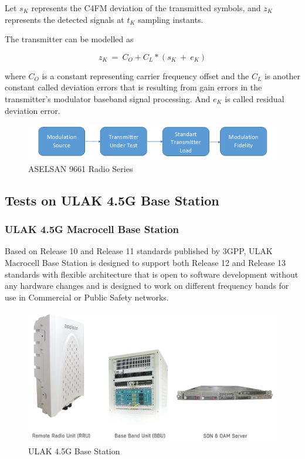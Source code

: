 	Let $s_K$ represents the C4FM deviation of the transmitted symbols, and $z_K$ represents the detected signals at $t_K$ sampling instants.
	
	The transmitter can be modelled as
	
	$$ z_K~=~C_O+C_L*(s_K~+~e_K) $$
	
	where $C_O$ is a constant representing carrier frequency offset and the $C_L$ is another constant called deviation errors that is resulting from gain errors in the transmitter's modulator baseband signal processing. And $e_K$ is called residual deviation error.
	
	
\begin{figure}[H]
	\center
	\setlength{\unitlength}{\textwidth} 
	\includegraphics[width=1.0\unitlength]{modfide}
	\caption{\label{fig:modfide}ASELSAN 9661 Radio Series }
\end{figure}






\subsection{Tests on ULAK 4.5G Base Station  }

\subsubsection{ULAK 4.5G Macrocell Base Station}
\- \indent
	Based on Release 10 and Release 11 standards published by 3GPP, ULAK Macrocell Base Station is designed to support both Release 12 and Release 13 standards with flexible architecture that is open to software development without any hardware changes and is designed to work on different frequency bands for use in Commercial or Public Safety networks.  

\begin{figure}[H]
	\center
	\setlength{\unitlength}{\textwidth} 
	\includegraphics[width=1.0\unitlength]{ulak}
	\caption{\label{fig:ulak}ULAK 4.5G Base Station }
\end{figure}	
	
